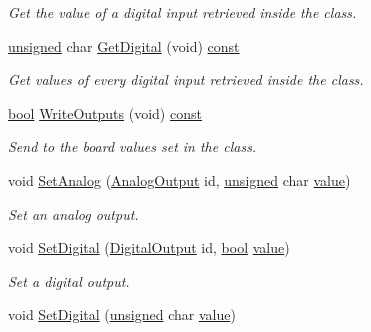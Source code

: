 \begin{DoxyCompactItemize}
\begin{DoxyCompactList}\small\item\em Get the value of a digital input retrieved inside the class. \end{DoxyCompactList}\item 
\hyperlink{curses_8priv_8h_aca40206900cfc164654362fa8d4ad1e6}{unsigned} char \hyperlink{classhbs_1_1_p_v_m110_n_a254057fa890b3b9471dd242d8a669c89}{Get\-Digital} (void) \hyperlink{term__entry_8h_a57bd63ce7f9a353488880e3de6692d5a}{const} 
\begin{DoxyCompactList}\small\item\em Get values of every digital input retrieved inside the class. \end{DoxyCompactList}\item 
\hyperlink{term__entry_8h_a002004ba5d663f149f6c38064926abac}{bool} \hyperlink{classhbs_1_1_p_v_m110_n_a861a92dfc5e075b99645d4b79cc87186}{Write\-Outputs} (void) \hyperlink{term__entry_8h_a57bd63ce7f9a353488880e3de6692d5a}{const} 
\begin{DoxyCompactList}\small\item\em Send to the board values set in the class. \end{DoxyCompactList}\item 
void \hyperlink{classhbs_1_1_p_v_m110_n_ab8097fb019bf042e7ed36b8e52bd2f6f}{Set\-Analog} (\hyperlink{classhbs_1_1_p_v_m110_n_acad2215726715b9d47760b291f49e45b}{Analog\-Output} id, \hyperlink{curses_8priv_8h_aca40206900cfc164654362fa8d4ad1e6}{unsigned} char \hyperlink{curses_8priv_8h_a3772851912abe3ccbff5c659ff71f2ff}{value})
\begin{DoxyCompactList}\small\item\em Set an analog output. \end{DoxyCompactList}\item 
void \hyperlink{classhbs_1_1_p_v_m110_n_a40b24ca5bfb81ce34edc062644ad398a}{Set\-Digital} (\hyperlink{classhbs_1_1_p_v_m110_n_a5465effcd4a5984d51ff2cabaeb7d228}{Digital\-Output} id, \hyperlink{term__entry_8h_a002004ba5d663f149f6c38064926abac}{bool} \hyperlink{curses_8priv_8h_a3772851912abe3ccbff5c659ff71f2ff}{value})
\begin{DoxyCompactList}\small\item\em Set a digital output. \end{DoxyCompactList}\item 
void \hyperlink{classhbs_1_1_p_v_m110_n_a67785a78469777efce7dae0a854addd6}{Set\-Digital} (\hyperlink{curses_8priv_8h_aca40206900cfc164654362fa8d4ad1e6}{unsigned} char \hyperlink{curses_8priv_8h_a3772851912abe3ccbff5c659ff71f2ff}{value})

\end{DoxyCompactItemize}
